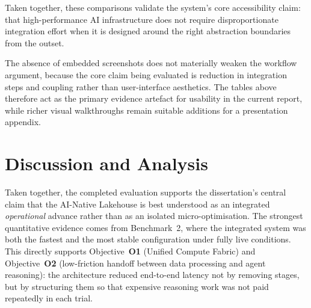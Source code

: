 \documentclass[12pt, a4paper]{report}
\newcommand{\placeholder}[1]{%
  \textcolor{red}{\textbf{[PLACEHOLDER: #1]}}%
}
\begin{document}
Taken together, these comparisons validate the system's core accessibility claim:
that high-performance AI infrastructure does not require disproportionate integration
effort when it is designed around the right abstraction boundaries from the outset.

The absence of embedded screenshots does not materially weaken the workflow
argument, because the core claim being evaluated is reduction in integration steps
and coupling rather than user-interface aesthetics. The tables above therefore act
as the primary evidence artefact for usability in the current report, while richer
visual walkthroughs remain suitable additions for a presentation appendix.

\section{Discussion and Analysis}
\label{sec:eval_discussion}

Taken together, the completed evaluation supports the dissertation's central claim
that the AI-Native Lakehouse is best understood as an integrated \emph{operational}
advance rather than as an isolated micro-optimisation. The strongest quantitative
evidence comes from Benchmark~2, where the integrated system was both the fastest and
the most stable configuration under fully live conditions. This directly supports
Objective~\textbf{O1} (Unified Compute Fabric) and Objective~\textbf{O2}
(low-friction handoff between data processing and agent reasoning): the architecture
reduced end-to-end latency not by removing stages, but by structuring them so that
expensive reasoning work was not paid repeatedly in each trial.
\end{document}
